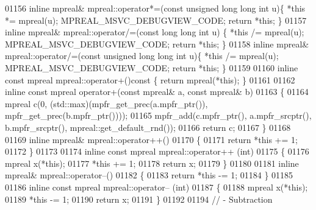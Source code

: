 \begin{DoxyCode}
01156 \textcolor{keyword}{inline} mpreal& mpreal::operator*=(\textcolor{keyword}{const} \textcolor{keywordtype}{unsigned} \textcolor{keywordtype}{long} \textcolor{keywordtype}{long} \textcolor{keywordtype}{int} u)\{    *\textcolor{keyword}{this} *= mpreal(u); 
      MPREAL\_MSVC\_DEBUGVIEW\_CODE; \textcolor{keywordflow}{return} *\textcolor{keyword}{this};    \}
01157 \textcolor{keyword}{inline} mpreal& mpreal::operator/=(\textcolor{keyword}{const} \textcolor{keywordtype}{long} \textcolor{keywordtype}{long} \textcolor{keywordtype}{int}  u)        \{    *\textcolor{keyword}{this} /= mpreal(u); 
      MPREAL\_MSVC\_DEBUGVIEW\_CODE; \textcolor{keywordflow}{return} *\textcolor{keyword}{this};    \}
01158 \textcolor{keyword}{inline} mpreal& mpreal::operator/=(\textcolor{keyword}{const} \textcolor{keywordtype}{unsigned} \textcolor{keywordtype}{long} \textcolor{keywordtype}{long} \textcolor{keywordtype}{int} u)\{    *\textcolor{keyword}{this} /= mpreal(u); 
      MPREAL\_MSVC\_DEBUGVIEW\_CODE; \textcolor{keywordflow}{return} *\textcolor{keyword}{this};    \}
01159 
01160 \textcolor{keyword}{inline} \textcolor{keyword}{const} mpreal mpreal::operator+()\textcolor{keyword}{const    }\{    \textcolor{keywordflow}{return} mpreal(*\textcolor{keyword}{this}); \}
01161 
01162 \textcolor{keyword}{inline} \textcolor{keyword}{const} mpreal operator+(\textcolor{keyword}{const} mpreal& a, \textcolor{keyword}{const} mpreal& b)
01163 \{
01164   mpreal c(0, (std::max)(mpfr\_get\_prec(a.mpfr\_ptr()), mpfr\_get\_prec(b.mpfr\_ptr())));
01165   mpfr\_add(c.mpfr\_ptr(), a.mpfr\_srcptr(), b.mpfr\_srcptr(), mpreal::get\_default\_rnd());
01166   \textcolor{keywordflow}{return} c;
01167 \}
01168 
01169 \textcolor{keyword}{inline} mpreal& mpreal::operator++()
01170 \{
01171     \textcolor{keywordflow}{return} *\textcolor{keyword}{this} += 1;
01172 \}
01173 
01174 \textcolor{keyword}{inline} \textcolor{keyword}{const} mpreal mpreal::operator++ (\textcolor{keywordtype}{int})
01175 \{
01176     mpreal x(*\textcolor{keyword}{this});
01177     *\textcolor{keyword}{this} += 1;
01178     \textcolor{keywordflow}{return} x;
01179 \}
01180 
01181 \textcolor{keyword}{inline} mpreal& mpreal::operator--()
01182 \{
01183     \textcolor{keywordflow}{return} *\textcolor{keyword}{this} -= 1;
01184 \}
01185 
01186 \textcolor{keyword}{inline} \textcolor{keyword}{const} mpreal mpreal::operator-- (\textcolor{keywordtype}{int})
01187 \{
01188     mpreal x(*\textcolor{keyword}{this});
01189     *\textcolor{keyword}{this} -= 1;
01190     \textcolor{keywordflow}{return} x;
01191 \}
01192 
01194 \textcolor{comment}{// - Subtraction}

\end{DoxyCode}
